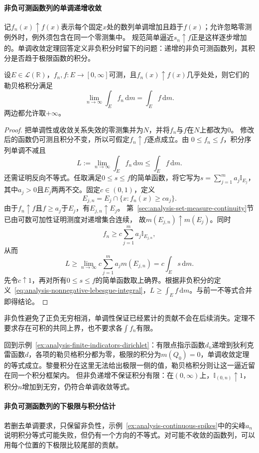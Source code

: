 \paragraph{非负可测函数列的单调递增收敛}
记$f_n(x)\uparrow f(x)$表示每个固定$x$处的数列单调增加且趋于$f(x)$；允许忽略零测例外时，例外须包含在同一个零测集中。
规范简单逼近$s_n\uparrow f$正是这样逐步增加的。单调收敛定理回答定义非负积分时留下的问题：递增的非负可测函数列，其积分是否趋于极限函数的积分。
\begin{theorem}[单调收敛定理]
\label{thm:analysis-monotone-convergence}
设$E\in\mathcal L(\mathbb R)$，$f_n,f:E\to[0,\infty]$可测，且$f_n(x)\uparrow f(x)$几乎处处，则它们的勒贝格积分满足
\[   \lim_{n\to\infty}\int_E f_n\,\mathrm{d}m   =   \int_E f\,\mathrm{d}m. \]
两边都允许取$+\infty$。
\end{theorem}
\begin{proof}
把单调性或收敛关系失效的零测集并为$N$，并将$f_n$与$f$在$N$上都改为$0$。
修改后的函数仍可测且积分不变，所以可假定$f_n\uparrow f$逐点成立。由
$0\leq f_n\leq f$，积分序列单调不减且
\[   L:=\lim_{n\to\infty}\int_E f_n\,\mathrm{d}m   \leq\int_E f\,\mathrm{d}m. \]
还需证明反向不等式。任取满足$0\leq s\leq f$的简单函数，将它写为$s=\sum_{j=1}^m a_j\mathbb{I}_{E_j}$，其中$a_j>0$且$E_j$两两不交。固定$c\in(0,1)$，定义
\[   E_{j,n}   =   E_j\cap\{x:f_n(x)\geq ca_j\}. \]
由于$f_n\uparrow f$且$f\geq a_j$于$E_j$，有$E_{j,n}\uparrow E_j$。
第~\ref{sec:analysis-set-measure-continuity}节已由可数可加性证明测度对递增集合连续，
故$m(E_{j,n})\uparrow m(E_j)$。同时
\[   f_n   \geq   c\sum_{j=1}^m a_j\mathbb{I}_{E_{j,n}}, \]
从而
\[   L   \geq   \lim_{n\to\infty}   c\sum_{j=1}^m a_jm(E_{j,n})   =   c\int_E s\,\mathrm{d}m. \]
先令$c\uparrow1$，再对所有$0\leq s\leq f$的简单函数取上确界。根据非负积分的定义~\eqref{eq:analysis-nonnegative-lebesgue-integral}，$L\geq\int_E f\,\mathrm{d}m$。与前一不等式合并即得结论。
\end{proof}

非负性避免了正负无穷相消，单调性保证已经累计的贡献不会在后续消失。定理不要求存在可积的共同上界，也不要求各$\int f_n$有限。

回到示例~\ref{ex:analysis-finite-indicators-dirichlet}：有限点指示函数$d_n$递增到狄利克雷函数$d$，各项的勒贝格积分都为零，极限的积分为$m(Q_0)=0$，单调收敛定理的等式成立。黎曼积分在这里无法给出极限一侧的值，勒贝格积分则让这一逼近留在同一个积分框架内。
但非负递增不保证积分有限：在$(0,\infty)$上，$\mathbb I_{(0,n)}\uparrow1$，积分$n$增加到无穷，仍符合单调收敛等式。

\paragraph{非负可测函数列的下极限与积分估计}
若删去单调要求，只保留非负性，示例~\ref{ex:analysis-continuous-spikes}中的尖峰$a_n$说明积分等式可能失败，但仍有一个方向的不等式。对可能不收敛的函数列，可以用每个位置的下极限比较尾部的贡献。

